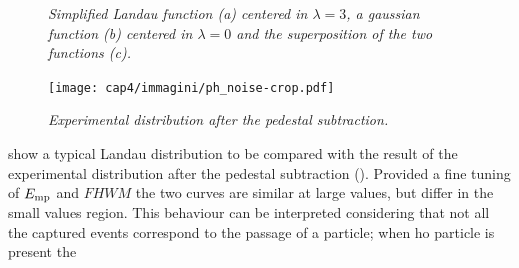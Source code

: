 \begin{figure}[!htbp]
  \centering
  \caption{\it Simplified Landau function (a) centered in $\lambda=3$, a
    gaussian function (b) centered in $\lambda=0$ and the superposition of the
    two functions (c).}
\end{figure}
\begin{figure}[!htbp]
  \centering
  \texttt{[image: cap4/immagini/ph\_noise-crop.pdf]}\label{fig:ph_noise}
  \caption{\it Experimental distribution after the pedestal subtraction.}
\end{figure}
 show a typical Landau distribution to be compared with the
result of the experimental distribution after the pedestal subtraction
(). Provided a fine tuning of $E_{\rm mp}$ and $FHWM$ the two
curves are similar at large values, but differ in the small values region. This
behaviour can be interpreted considering that not all the captured events
correspond to the passage of a particle; when ho particle is present the
